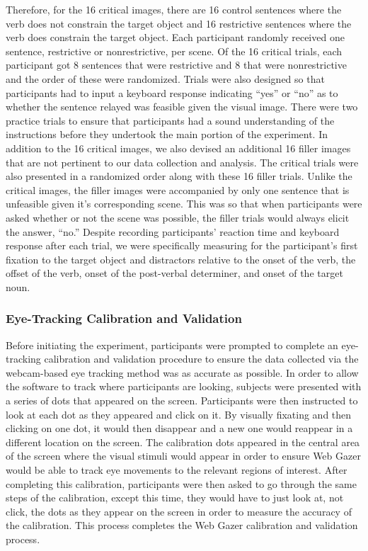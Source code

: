 \documentclass[
  english,
  man]{apa6}
\begin{document}
Therefore, for the 16 critical images, there are 16 control sentences where the verb does not constrain the target object and 16 restrictive sentences where the verb does constrain the target object. Each participant randomly received one sentence, restrictive or nonrestrictive, per scene. Of the 16 critical trials, each participant got 8 sentences that were restrictive and 8 that were nonrestrictive and the order of these were randomized. Trials were also designed so that participants had to input a keyboard response indicating ``yes'' or ``no'' as to whether the sentence relayed was feasible given the visual image. There were two practice trials to ensure that participants had a sound understanding of the instructions before they undertook the main portion of the experiment.
In addition to the 16 critical images, we also devised an additional 16 filler images that are not pertinent to our data collection and analysis. The critical trials were also presented in a randomized order along with these 16 filler trials. Unlike the critical images, the filler images were accompanied by only one sentence that is unfeasible given it's corresponding scene. This was so that when participants were asked whether or not the scene was possible, the filler trials would always elicit the answer, ``no.''
Despite recording participants' reaction time and keyboard response after each trial, we were specifically measuring for the participant's first fixation to the target object and distractors relative to the onset of the verb, the offset of the verb, onset of the post-verbal determiner, and onset of the target noun.

\hypertarget{eye-tracking-calibration-and-validation}{%
\subsubsection{Eye-Tracking Calibration and Validation}\label{eye-tracking-calibration-and-validation}}

Before initiating the experiment, participants were prompted to complete an eye-tracking calibration and validation procedure to ensure the data collected via the webcam-based eye tracking method was as accurate as possible. In order to allow the software to track where participants are looking, subjects were presented with a series of dots that appeared on the screen. Participants were then instructed to look at each dot as they appeared and click on it. By visually fixating and then clicking on one dot, it would then disappear and a new one would reappear in a different location on the screen. The calibration dots appeared in the central area of the screen where the visual stimuli would appear in order to ensure Web Gazer would be able to track eye movements to the relevant regions of interest. After completing this calibration, participants were then asked to go through the same steps of the calibration, except this time, they would have to just look at, not click, the dots as they appear on the screen in order to measure the accuracy of the calibration. This process completes the Web Gazer calibration and validation process.
\end{document}
